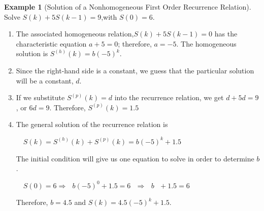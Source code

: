 \documentclass[10pt,]{book}
\theoremstyle{plain}
\theoremstyle{definition}
\theoremstyle{definition}
\theoremstyle{definition}
\newtheorem{example}[theorem]{Example}
\theoremstyle{definition}
\numberwithin{equation}{section}
\begin{document}
\begin{example}[Solution of a Nonhomogeneous First Order Recurrence Relation]\label{ex-nhrr-solution-example-1}
 Solve \(S(k) + 5S(k - 1) = 9\),with \(S(0) = 6\).%
\par
\leavevmode%
\begin{enumerate}[label=\alph*]
\item\hypertarget{li-54}{}The associated homogeneous relation,\(S(k) + 5S(k - 1) = 0\) has the characteristic equation \(a + 5 = 0\); therefore, \(a = -5\). The
homogeneous solution is \(S^{(h)}(k) =b (-5)^k\).%
\item\hypertarget{li-55}{}Since the right-hand side is a constant, we guess that the particular solution will be a constant, \(d\).%
\item\hypertarget{li-56}{} If we substitute \(S^{(p)}(k) = d\) into the recurrence relation, we get \(d + 5d = 9\), or \(6d = 9\). Therefore, \(S^{(p)}(k)=1.5\)%
\item\hypertarget{li-57}{} The general solution of the recurrence relation is 

\(\quad\)\(S(k)= S^{(h)}(k)+S^{(p)}(k) =b (-5)^k+1.5\)

The initial condition will give us one equation to solve in order to determine \(b\).

\(\quad\)\(S(0) = 6 \Rightarrow \textrm{   }b(-5)^0+ 1.5 = 6\textrm{   }\Rightarrow \textrm{    }b\textrm{  }+ 1.5 = 6\)

Therefore, \(b = 4.5\) and \(S(k) = 4.5(-5)^k + 1.5\).%
\end{enumerate}
%
\end{example}
\end{document}
